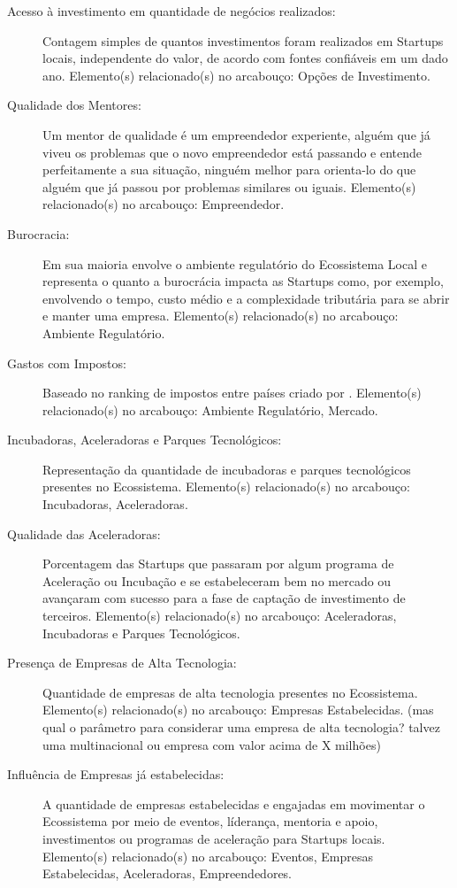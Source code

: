 \begin{description}
  \item [Acesso à investimento em quantidade de negócios realizados:] Contagem simples de quantos investimentos foram realizados em Startups locais, independente do valor, de acordo com fontes confiáveis em um dado ano. Elemento(s) relacionado(s) no arcabouço: Opções de Investimento.

  \item [Qualidade dos Mentores:] Um mentor de qualidade é um empreendedor experiente, alguém que já viveu os problemas que o novo empreendedor está passando e entende perfeitamente a sua situação, ninguém melhor para orienta-lo do que alguém que já passou por problemas similares ou iguais. Elemento(s) relacionado(s) no arcabouço: Empreendedor.

  \item [Burocracia:] Em sua maioria envolve o ambiente regulatório do Ecossistema Local e representa o quanto a burocrácia impacta as Startups como, por exemplo, envolvendo o tempo, custo médio e a complexidade tributária para se abrir e manter uma empresa. Elemento(s) relacionado(s) no arcabouço: Ambiente Regulatório.

  \item [Gastos com Impostos:] Baseado no ranking de impostos entre países criado por . Elemento(s) relacionado(s) no arcabouço: Ambiente Regulatório, Mercado. 

  \item [Incubadoras, Aceleradoras e Parques Tecnológicos:] Representação da quantidade de incubadoras e parques tecnológicos presentes no Ecossistema. Elemento(s) relacionado(s) no arcabouço: Incubadoras, Aceleradoras.

  \item [Qualidade das Aceleradoras:] Porcentagem das Startups que passaram por algum programa de Aceleração ou Incubação e se estabeleceram bem no mercado ou avançaram com sucesso para a fase de captação de investimento de terceiros. Elemento(s) relacionado(s) no arcabouço: Aceleradoras, Incubadoras e Parques Tecnológicos.

  \item [Presença de Empresas de Alta Tecnologia:] Quantidade de empresas de alta tecnologia presentes no Ecossistema. Elemento(s) relacionado(s) no arcabouço: Empresas Estabelecidas. (mas qual o parâmetro para considerar uma empresa de alta tecnologia? talvez uma multinacional ou empresa com valor acima de X milhões)

  \item [Influência de Empresas já estabelecidas:] A quantidade de empresas estabelecidas e engajadas em movimentar o Ecossistema por meio de eventos, líderança, mentoria e apoio, investimentos ou programas de aceleração para Startups locais. Elemento(s) relacionado(s) no arcabouço: Eventos, Empresas Estabelecidas, Aceleradoras, Empreendedores.


\end{description}
